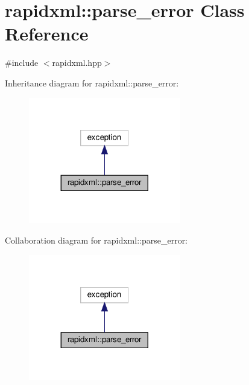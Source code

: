 \hypertarget{classrapidxml_1_1parse__error}{}\section{rapidxml\+:\+:parse\+\_\+error Class Reference}
\label{classrapidxml_1_1parse__error}


{\ttfamily \#include $<$rapidxml.\+hpp$>$}



Inheritance diagram for rapidxml\+:\+:parse\+\_\+error\+:
\nopagebreak
\begin{figure}[H]
\begin{center}
\leavevmode
\includegraphics[width=188pt]{classrapidxml_1_1parse__error__inherit__graph}
\end{center}
\end{figure}


Collaboration diagram for rapidxml\+:\+:parse\+\_\+error\+:
\nopagebreak
\begin{figure}[H]
\begin{center}
\leavevmode
\includegraphics[width=188pt]{classrapidxml_1_1parse__error__coll__graph}
\end{center}
\end{figure}

